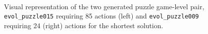\documentclass[a4paper,titlepage,final]{report}
\begin{document}
\begin{figure}[!ht]
	\hfill
	\\
    	\caption{Visual representation of the two generated puzzle game-level pair, \texttt{evol_puzzle015} requiring 85 actions (left) and \texttt{evol_puzzle009} requiring 24 (right) actions for the shortest solution.}
	\label{fig:evol_puzzle_genlvls}
\end{figure}
\end{document}
